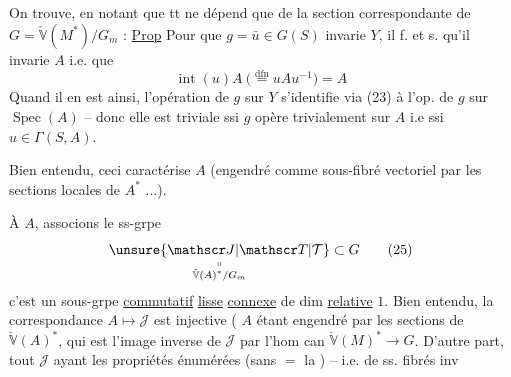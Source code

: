 On trouve, en notant que tt ne dépend que de la section correspondante de $G=\check{\mathbb V}(M^*)/G_m$ :
\uline{Prop} Pour que $g=\bar u\in G(S)$ invarie $Y$, il f. et s. qu'il invarie $A$ i.e. que 
\[
 \operatorname{int}(u)A\ \bigl(\overset{\mathrm{dfn}}{=}uAu^{-1}\bigr)=A
\]
Quand il en est ainsi, l'opération de $g$ sur $Y$  s'identifie via (23) à l'op. de $g$  sur $\operatorname{Spec}(A)$ -- donc elle est triviale ssi $g$ opère trivialement sur $A$ i.e ssi $u\in\Gamma(S,A)$.

Bien entendu, ceci caractérise $A$  (engendré comme sous-fibré vectoriel par les sections locales de $A^*$ ...).

À  $A$, associons le ss-grpe
\[
 \underset{\substack{\shortparallel\\\check{\mathbb V}(A)^*/G_m}}{\unsure{\mathscr J|\mathscr T|\mathcal T}}\subset G\tag*{(25)}
\]
c'est un sous-grpe \uline{commutatif} \uline{lisse} \uline{connexe} de dim \uline{relative} $1$. Bien entendu, la correspondance $A\mapsto\mathscr J$ est injective ( $A$ étant engendré par  les sections de $\check{\mathbb V}(A)^*$, qui est l'image inverse de $\mathscr J$ par l'hom can $\check{\mathbb V}(M)^*\longrightarrow G$.
D'autre part,  tout $\mathscr J$ ayant les propriétés énumérées (sans $=$ la )  -- i.e. de ss. fibrés inv
